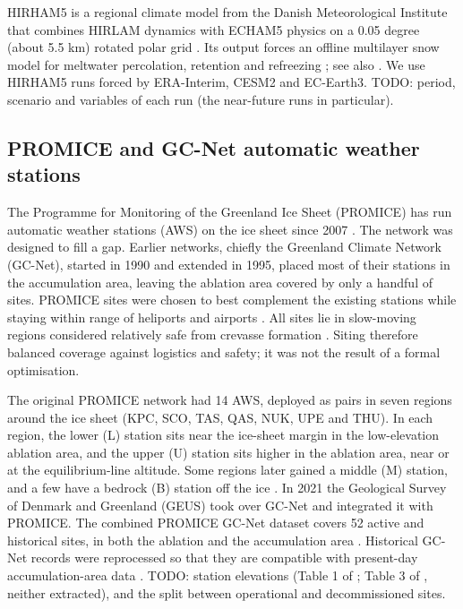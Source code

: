 \documentclass[tc, manuscript]{copernicus}
\begin{document}
HIRHAM5 is a regional climate model from the Danish Meteorological
Institute that combines HIRLAM dynamics with ECHAM5 physics on a 0.05
degree (about 5.5 km) rotated polar grid \citep{lucaspicher2012}. Its
output forces an offline multilayer snow model for meltwater
percolation, retention and refreezing \citep{langen2017}; see also
\citet{mottram2017}. We use HIRHAM5 runs forced by ERA-Interim, CESM2
and EC-Earth3. TODO: period, scenario and variables of each run (the
near-future runs in particular).

\subsection{PROMICE and GC-Net automatic weather
stations}\label{promice-and-gc-net-automatic-weather-stations}

The Programme for Monitoring of the Greenland Ice Sheet (PROMICE) has
run automatic weather stations (AWS) on the ice sheet since 2007
\citep{fausto2021}. The network was designed to fill a gap. Earlier
networks, chiefly the Greenland Climate Network (GC-Net), started in
1990 and extended in 1995, placed most of their stations in the
accumulation area, leaving the ablation area covered by only a handful
of sites. PROMICE sites were chosen to best complement the existing
stations while staying within range of heliports and airports
\citep{fausto2021}. All sites lie in slow-moving regions considered
relatively safe from crevasse formation \citep{fausto2026}. Siting
therefore balanced coverage against logistics and safety; it was not the
result of a formal optimisation.

The original PROMICE network had 14 AWS, deployed as pairs in seven
regions around the ice sheet (KPC, SCO, TAS, QAS, NUK, UPE and THU). In
each region, the lower (L) station sits near the ice-sheet margin in the
low-elevation ablation area, and the upper (U) station sits higher in
the ablation area, near or at the equilibrium-line altitude. Some
regions later gained a middle (M) station, and a few have a bedrock (B)
station off the ice \citep{fausto2021}. In 2021 the Geological Survey of
Denmark and Greenland (GEUS) took over GC-Net and integrated it with
PROMICE. The combined PROMICE \textbar{} GC-Net dataset covers 52 active
and historical sites, in both the ablation and the accumulation area
\citep{fausto2026}. Historical GC-Net records were reprocessed so that
they are compatible with present-day accumulation-area data
\citep{vandecrux2023}. TODO: station elevations (Table 1 of
\citet{fausto2021}; Table 3 of \citet{fausto2026}, neither extracted),
and the split between operational and decommissioned sites.
\end{document}
